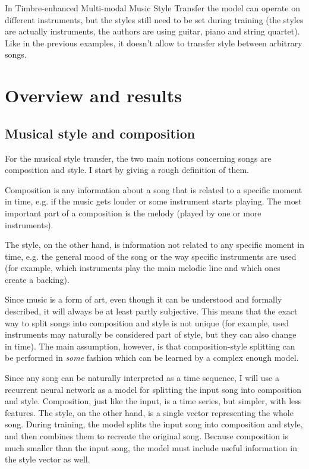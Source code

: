 \documentclass[en]{pracamgr}
\begin{document}
In Timbre-enhanced Multi-modal Music Style Transfer \cite{multimodal} the model can operate on different instruments, but the styles still need to be set during training (the styles are actually instruments, the authors are using guitar, piano and string quartet).
Like in the previous examples, it doesn't allow to transfer style between arbitrary songs.

\chapter{Overview and results}

\section{Musical style and composition}

For the musical style transfer, the two main notions concerning songs are composition and style.
I start by giving a rough definition of them.

Composition is any information about a song that is related to a specific moment in time, e.g. if the music gets louder or some instrument starts playing.
The most important part of a composition is the melody (played by one or more instruments).

The style, on the other hand, is information not related to any specific moment in time, e.g. the general mood of the song or the way specific instruments are used (for example, which instruments play the main melodic line and which ones create a backing).

Since music is a form of art, even though it can be understood and formally described, it will always be at least partly subjective.
This means that the exact way to split songs into composition and style is not unique (for example, used instruments may naturally be considered part of style, but they can also change in time).
The main assumption, however, is that composition-style splitting can be performed in \emph{some} fashion which can be learned by a complex enough model.

Since any song can be naturally interpreted as a time sequence, I will use a recurrent neural network as a model for splitting the input song into composition and style.
Composition, just like the input, is a time series, but simpler, with less features.
The style, on the other hand, is a single vector representing the whole song.
During training, the model splits the input song into composition and style, and then combines them to recreate the original song.
Because composition is much smaller than the input song, the model must include useful information in the style vector as well.
\end{document}

